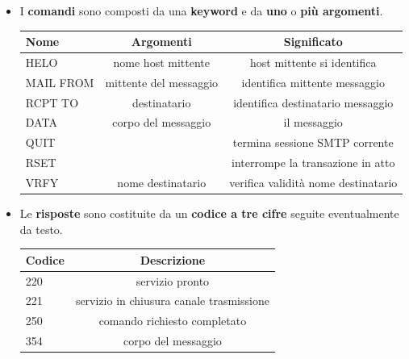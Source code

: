 \documentclass[11pt,a4paper,oneside]{book}
\theoremstyle{definition}
\begin{document}
\begin{itemize}
	\item I \textbf{comandi} sono composti da una \textbf{keyword} e da \textbf{uno} o \textbf{più argomenti}.
	      \begin{table}[h!]
		      \begin{center}
			      \label{tab:table1}
			      \begin{tabular}{l|c|c}
				      \textbf{Nome} & \textbf{Argomenti}     & \textbf{Significato}                \\
				      \hline
				      HELO          & nome host mittente     & host mittente si identifica         \\
				      MAIL FROM     & mittente del messaggio & identifica mittente  messaggio      \\
				      RCPT TO       & destinatario           & identifica destinatario messaggio   \\
				      DATA          & corpo del messaggio    & il messaggio                        \\
				      QUIT          &                        & termina sessione SMTP
				      corrente                                                                     \\
				      RSET          &                        & interrompe la transazione in atto   \\
				      VRFY          & nome destinatario      & verifica validità nome destinatario \\
			      \end{tabular}
		      \end{center}
	      \end{table}
	\item Le \textbf{risposte} sono costituite da un \textbf{codice a tre cifre} seguite eventualmente da testo.
	      \begin{table}[h!]
		      \begin{center}
			      \label{tab:table1}
			      \begin{tabular}{l|c}
				      \textbf{Codice} & \textbf{Descrizione}                     \\
				      \hline
				      220             & servizio pronto                          \\
				      221             & servizio in chiusura canale trasmissione \\
				      250             & comando richiesto completato             \\
				      354             & corpo del messaggio                      \\

\end{tabular}
\end{center}
\end{table}
\end{itemize}
\end{document}
